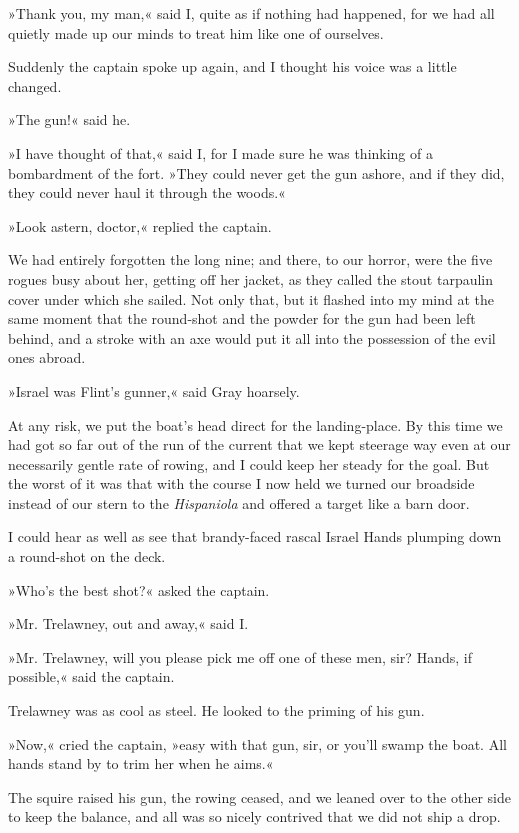 »Thank you, my man,« said I, quite as if nothing had happened, for we had all quietly made up our minds to treat him like one of ourselves.

Suddenly the captain spoke up again, and I thought his voice was a little changed.

»The gun!« said he.

»I have thought of that,« said I, for I made sure he was thinking of a bombardment of the fort. »They could never get the gun ashore, and if they did, they could never haul it through the woods.«

»Look astern, doctor,« replied the captain.

We had entirely forgotten the long nine; and there, to our horror, were the five rogues busy about her, getting off her jacket, as they called the stout tarpaulin cover under which she sailed. Not only that, but it flashed into my mind at the same moment that the round-shot and the powder for the gun had been left behind, and a stroke with an axe would put it all into the possession of the evil ones abroad.

»Israel was Flint's gunner,« said Gray hoarsely.

At any risk, we put the boat's head direct for the landing-place. By this time we had got so far out of the run of the current that we kept steerage way even at our necessarily gentle rate of rowing, and I could keep her steady for the goal. But the worst of it was that with the course I now held we turned our broadside instead of our stern to the \textit{Hispaniola} and offered a target like a barn door.

I could hear as well as see that brandy-faced rascal Israel Hands plumping down a round-shot on the deck.

»Who's the best shot?« asked the captain.

»Mr. Trelawney, out and away,« said I.

»Mr. Trelawney, will you please pick me off one of these men, sir? Hands, if possible,« said the captain.

Trelawney was as cool as steel. He looked to the priming of his gun.

»Now,« cried the captain, »easy with that gun, sir, or you'll swamp the boat. All hands stand by to trim her when he aims.«

The squire raised his gun, the rowing ceased, and we leaned over to the other side to keep the balance, and all was so nicely contrived that we did not ship a drop.

